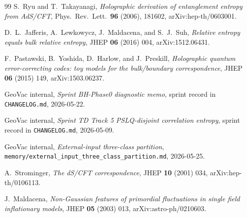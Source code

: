\documentclass[11pt,a4paper]{article}
\theoremstyle{plain}
\theoremstyle{definition}
\begin{document}
\begin{thebibliography}{99}
 S.~Ryu and T.~Takayanagi,
\emph{Holographic derivation of entanglement entropy from AdS/CFT},
Phys.~Rev.~Lett.\ \textbf{96} (2006), 181602, arXiv:hep-th/0603001.

 D.~L.~Jafferis, A.~Lewkowycz, J.~Maldacena, and S.~J.~Suh,
\emph{Relative entropy equals bulk relative entropy},
JHEP \textbf{06} (2016) 004, arXiv:1512.06431.

 F.~Pastawski, B.~Yoshida, D.~Harlow, and J.~Preskill,
\emph{Holographic quantum error-correcting codes: toy models for the bulk/boundary correspondence},
JHEP \textbf{06} (2015) 149, arXiv:1503.06237.

 GeoVac internal,
\emph{Sprint BH-Phase0 diagnostic memo},
sprint record in \texttt{CHANGELOG.md}, 2026-05-22.

 GeoVac internal,
\emph{Sprint TD Track 5 PSLQ-disjoint correlation entropy},
sprint record in \texttt{CHANGELOG.md}, 2026-05-09.

 GeoVac internal,
\emph{External-input three-class partition},
\texttt{memory/external\_input\_three\_class\_partition.md}, 2026-05-25.

 A.~Strominger,
\emph{The dS/CFT correspondence},
JHEP \textbf{10} (2001) 034, arXiv:hep-th/0106113.

 J.~Maldacena,
\emph{Non-Gaussian features of primordial fluctuations in single field inflationary models},
JHEP \textbf{05} (2003) 013, arXiv:astro-ph/0210603.

\end{thebibliography}
\end{document}
